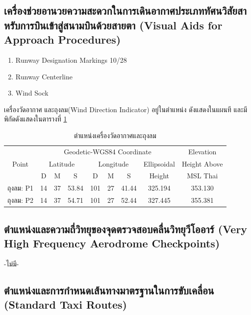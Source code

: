 \subsection{เครื่องช่วยอานวยความสะดวกในการเดินอากาศประเภททัศนวิสัยสาหรับการบินเข้าสู่สนามบินด้วยสายตา (Visual Aids for Approach Procedures)}

\begin{enumerate}
\item Runway Designation Markings 10/28
\item Runway Centerline
\item Wind Sock
\end{enumerate}

เครื่องวัดอากาศ และถุงลม(Wind Direction Indicator) อยู่ในตำแหน่ง ดังแสดงในแผนที และมีพิกัดดังแสดงในตารางที่ \ref{ตำแหน่งเครื่องวัดอากาศและถุงลม} 

\begin{table}[h!]
\caption{ตำแหน่งเครื่องวัดอากาศและถุงลม}
\begin{center}
\begin{tabular}{|c|c|c|c|c|c|c|c|c|}
\hline
\multirow{3}{*}{Point} & \multicolumn{7}{c|}{Geodetic-WGS84 Coordinate} & Elevation \\ \cline{2-9}
 & \multicolumn{3}{c|}{Latitude} & \multicolumn{3}{c|}{Longitude} & Ellipsoidal & Height Above \\ \cline{2-9}
  & D & M & S & D & M & S & Height & MSL Thai \\
\hline
ถุงลม: P1 & 14 & 37 & 53.84 & 101 & 27 & 41.44 & 325.194 & 353.130 \\
ถุงลม: P2 & 14 & 37 & 54.71 & 101 & 27 & 52.44 & 327.445 & 355.381 \\
\hline 
\end{tabular}
\end{center}
\label{ตำแหน่งเครื่องวัดอากาศและถุงลม}
\end{table}%

\subsection{ตำแหน่งและความถี่วิทยุของจุดตรวจสอบคลื่นวิทยุวีโออาร์ (Very High Frequency Aerodrome Checkpoints)}

-ไม่มี-

\subsection{ตำแหน่งและการกำหนดเส้นทางมาตรฐานในการขับเคลื่อน (Standard Taxi Routes)}

